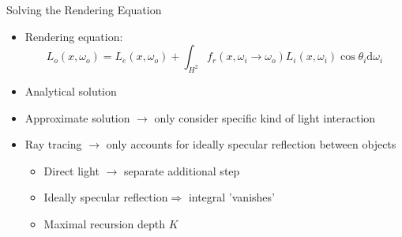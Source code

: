 \begin{frame}{Solving the Rendering Equation}
\begin{itemize}
\item Rendering equation:
\begin{equation*} L_o(x, \omega_o) =  L_e(x, \omega_o) + \int_{H^2} f_r(x, \omega_i \rightarrow \omega_o) L_i(x, \omega_i) \cos \theta_i \mathrm{d}\omega_i 
\end{equation*}
\pause
\item Analytical solution 
\pause
\item Approximate solution $\rightarrow$ only consider specific kind of light interaction
\pause
\item Ray tracing $\rightarrow$ only accounts for ideally specular reflection between objects
\begin{itemize}
	\pause
	\item Direct light $\rightarrow$ separate additional step
    \pause
    \item  Ideally specular reflection$\Rightarrow$ integral 'vanishes'
    \pause
    \item Maximal recursion depth $K$
\end{itemize}
\end{itemize}
\end{frame}

